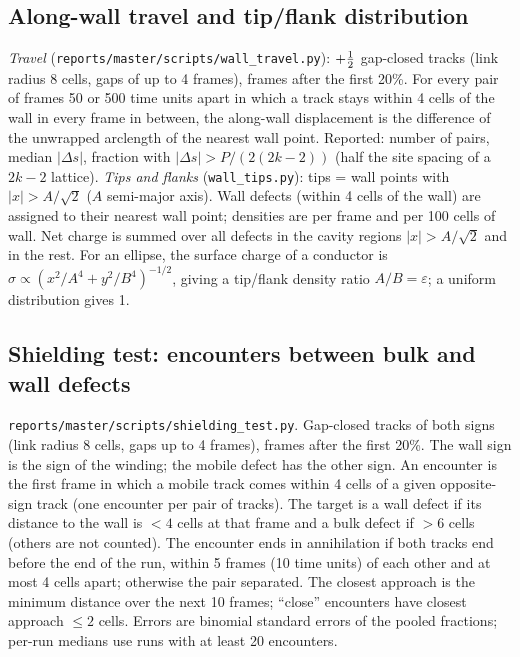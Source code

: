 \subsection{Along-wall travel and tip/flank distribution}\label{sec:m-tips}
\emph{Travel} (\texttt{reports/master/scripts/wall\_travel.py}): $+\tfrac12$ gap-closed tracks (link radius 8 cells, gaps of up to 4 frames),
frames after the first 20\%. For every pair of frames 50 or 500 time units apart in which a track stays within 4 cells of the wall in
every frame in between, the along-wall displacement is the difference of the unwrapped arclength of the nearest wall point. Reported:
number of pairs, median $|\Delta s|$, fraction with $|\Delta s|>P/(2(2k-2))$ (half the site spacing of a $2k-2$ lattice).
\emph{Tips and flanks} (\texttt{wall\_tips.py}): tips = wall points with $|x|>A/\sqrt2$ ($A$ semi-major axis). Wall defects (within 4 cells of the
wall) are assigned to their nearest wall point; densities are per frame and per 100 cells of wall. Net charge is summed over all defects in
the cavity regions $|x|>A/\sqrt2$ and in the rest. For an ellipse, the surface charge of a conductor is
$\sigma\propto(x^2/A^4+y^2/B^4)^{-1/2}$, giving a tip/flank density ratio $A/B=\varepsilon$; a uniform distribution gives 1.

\subsection{Shielding test: encounters between bulk and wall defects}\label{sec:m-shield}
\texttt{reports/master/scripts/shielding\_test.py}. Gap-closed tracks of both signs (link radius 8 cells, gaps up to 4 frames), frames after
the first 20\%. The wall sign is the sign of the winding; the mobile defect has the other sign. An encounter is the first frame in which a
mobile track comes within 4 cells of a given opposite-sign track (one encounter per pair of tracks). The target is a wall defect if its distance
to the wall is $<4$ cells at that frame and a bulk defect if $>6$ cells (others are not counted). The encounter ends in annihilation if both
tracks end before the end of the run, within 5 frames (10 time units) of each other and at most 4 cells apart; otherwise the pair separated.
The closest approach is the minimum distance over the next 10 frames; ``close'' encounters have closest approach $\le2$ cells. Errors are
binomial standard errors of the pooled fractions; per-run medians use runs with at least 20 encounters.
